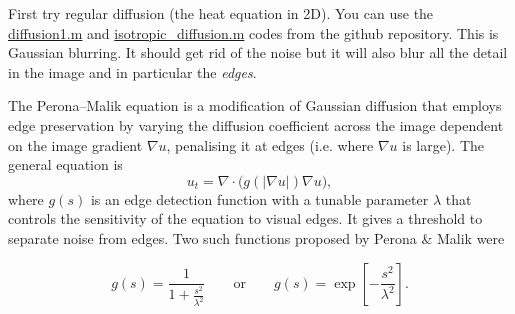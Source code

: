 \documentclass[12pt,a4paper]{article}
\begin{document}
First try regular diffusion (the heat equation in 2D). You can use the 
\url{diffusion1.m} and \url{isotropic_diffusion.m} codes from the github 
repository. This is Gaussian blurring.  It should get rid of the noise but it will also
blur all the detail in the image and in particular the \emph{edges}.

The Perona--Malik equation is a
modification of Gaussian diffusion that employs edge preservation by
varying the diffusion coefficient across the image dependent on the image gradient $\nabla u$, penalising it at edges (i.e. where $\nabla u$ is large).
The general equation is
$$u_t = \nabla \cdot \big( g(|\nabla u|) \nabla u \big),
$$
where $g(s)$ is an edge detection function with a tunable parameter $\lambda$ that
controls the sensitivity of the equation to visual edges.  It gives a
threshold to separate noise from edges. Two such functions proposed by Perona \& Malik were

$$
g(s) = \frac{1}{1+\frac{s^2}{\lambda^2}} \qquad \text{or} \qquad g(s) = \exp \left [-\frac{s^2}{\lambda^2} \right ].
$$

\end{document}
